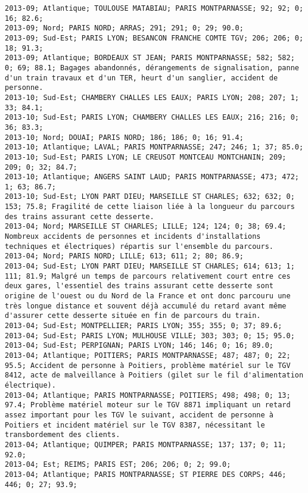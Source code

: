 \documentclass{article}
\begin{document}
\begin{Verbatim}[commandchars=\\\{\}]
2013-09; Atlantique; TOULOUSE MATABIAU; PARIS MONTPARNASSE; 92; 92; 0; 16; 82.6; 
2013-09; Nord; PARIS NORD; ARRAS; 291; 291; 0; 29; 90.0; 
2013-09; Sud-Est; PARIS LYON; BESANCON FRANCHE COMTE TGV; 206; 206; 0; 18; 91.3; 
2013-09; Atlantique; BORDEAUX ST JEAN; PARIS MONTPARNASSE; 582; 582; 0; 69; 88.1; Bagages abandonnés, dérangements de signalisation, panne d'un train travaux et d'un TER, heurt d'un sanglier, accident de personne.
2013-10; Sud-Est; CHAMBERY CHALLES LES EAUX; PARIS LYON; 208; 207; 1; 33; 84.1; 
2013-10; Sud-Est; PARIS LYON; CHAMBERY CHALLES LES EAUX; 216; 216; 0; 36; 83.3; 
2013-10; Nord; DOUAI; PARIS NORD; 186; 186; 0; 16; 91.4; 
2013-10; Atlantique; LAVAL; PARIS MONTPARNASSE; 247; 246; 1; 37; 85.0; 
2013-10; Sud-Est; PARIS LYON; LE CREUSOT MONTCEAU MONTCHANIN; 209; 209; 0; 32; 84.7; 
2013-10; Atlantique; ANGERS SAINT LAUD; PARIS MONTPARNASSE; 473; 472; 1; 63; 86.7; 
2013-10; Sud-Est; LYON PART DIEU; MARSEILLE ST CHARLES; 632; 632; 0; 153; 75.8; Fragilité de cette liaison liée à la longueur du parcours des trains assurant cette desserte.
2013-04; Nord; MARSEILLE ST CHARLES; LILLE; 124; 124; 0; 38; 69.4; Nombreux accidents de personnes et incidents d'installations techniques et électriques) répartis sur l'ensemble du parcours.
2013-04; Nord; PARIS NORD; LILLE; 613; 611; 2; 80; 86.9; 
2013-04; Sud-Est; LYON PART DIEU; MARSEILLE ST CHARLES; 614; 613; 1; 111; 81.9; Malgré un temps de parcours relativement court entre ces deux gares, l'essentiel des trains assurant cette desserte sont origine de l'ouest ou du Nord de la France et ont donc parcouru une très longue distance et souvent déjà accumulé du retard avant même d'assurer cette desserte située en fin de parcours du train.
2013-04; Sud-Est; MONTPELLIER; PARIS LYON; 355; 355; 0; 37; 89.6; 
2013-04; Sud-Est; PARIS LYON; MULHOUSE VILLE; 303; 303; 0; 15; 95.0; 
2013-04; Sud-Est; PERPIGNAN; PARIS LYON; 146; 146; 0; 16; 89.0; 
2013-04; Atlantique; POITIERS; PARIS MONTPARNASSE; 487; 487; 0; 22; 95.5; Accident de personne à Poitiers, problème matériel sur le TGV 8412, acte de malveillance à Poitiers (gilet sur le fil d'alimentation électrique).
2013-04; Atlantique; PARIS MONTPARNASSE; POITIERS; 498; 498; 0; 13; 97.4; Problème matériel moteur sur le TGV 8871 impliquant un retard assez important pour les TGV le suivant, accident de personne à Poitiers et incident matériel sur le TGV 8387, nécessitant le transbordement des clients.
2013-04; Atlantique; QUIMPER; PARIS MONTPARNASSE; 137; 137; 0; 11; 92.0; 
2013-04; Est; REIMS; PARIS EST; 206; 206; 0; 2; 99.0; 
2013-04; Atlantique; PARIS MONTPARNASSE; ST PIERRE DES CORPS; 446; 446; 0; 27; 93.9; 

\end{Verbatim}
\end{document}
